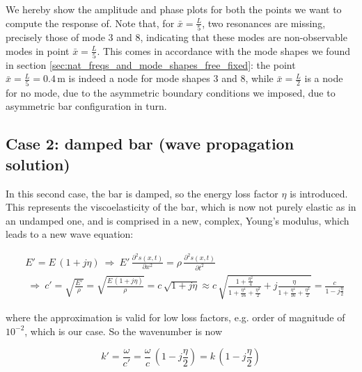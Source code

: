 \documentclass[a4paper,12pt,oneside]{article}
\begin{document}
\vspace{20pt}

We hereby show the amplitude and phase plots for both the points we want to compute the response of. Note that, for $ \bar{x} = \frac{L}{5} $, two resonances are missing, precisely those of mode 3 and 8, indicating that these modes are non-observable modes in point $ \bar{x} = \frac{L}{5} $. This comes in accordance with the mode shapes we found in section \ref{sec:nat_freqs_and_mode_shapes_free_fixed}: the point $ \bar{x} = \frac{L}{5} = 0.4 \, \text{m} $ is indeed a node for mode shapes 3 and 8, while $ \bar{x} = \frac{L}{2} $ is a node for no mode, due to the asymmetric boundary conditions we imposed, due to asymmetric bar configuration in turn.

\clearpage

\begin{figure}[h]
	\vspace{50pt}
	\centering
	\def\svgwidth{\columnwidth}
	
\end{figure}

\subsection*{Case 2: damped bar (wave propagation solution)}

In this second case, the bar is damped, so the energy loss factor $ \eta $ is introduced. This represents the viscoelasticity of the bar, which is now not purely elastic as in an undamped one, and is comprised in a new, complex, Young's modulus, which leads to a new wave equation:

\[ \begin{split}
	& E' = E \, (1 + j \eta) ~ \Rightarrow ~
		E' \,	\frac{\partial^2 s(x,t)}{\partial x^2} =
		\rho \, \frac{\partial^2 s(x,t)}{\partial t^2} \\
	& ~ \Rightarrow ~ c' = \sqrt{\frac{E'}{\rho}} = \sqrt{\frac{E \,(1 + j \eta)}{\rho}}
		= c \, \sqrt{1 + j \eta} \approx
		c \, \sqrt{\frac{1 + \frac{\eta^2}{4}}{1 + \frac{\eta^4}{16} + \frac{\eta^2}{2}} +
		j \frac{\eta}{1 + \frac{\eta^4}{16} + \frac{\eta^2}{2}}}
		= \frac{c}{1 - j \frac{\eta}{2}}
\end{split} \]

where the approximation is valid for low loss factors, e.g. order of magnitude of $ 10^{-2} $, which is our case. So the wavenumber is now

\[
	k' = \frac{\omega}{c'} = \frac{\omega}{c} \, (1 - j \frac{\eta}{2})
		= k \, (1 - j \frac{\eta}{2})
\]
\end{document}
